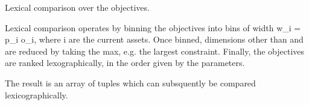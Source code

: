 \documentclass[letterpaper,10pt,english]{sphinxmanual}
\begin{document}
\begin{fulllineitems}
\label{\detokenize{api:muse.decisions.retro_lexical_comparison}}
Lexical comparison over the objectives.

Lexical comparison operates by binning the objectives into bins of width
w\_i = p\_i o\_i, where i are the current assets. Once binned, dimensions other
than  and  are reduced by taking the max, e.g. the
largest constraint.  Finally, the objectives are ranked lexographically, in
the order given by the parameters.

The result is an array of tuples which can subsquently be compared
lexicographically.

\end{fulllineitems}

\end{document}
